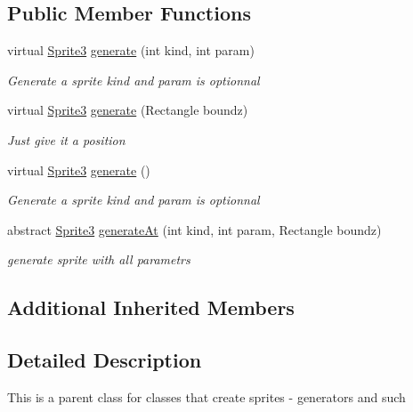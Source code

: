 \subsection*{Public Member Functions}
\begin{DoxyCompactItemize}
\item 
virtual \mbox{\hyperlink{class_r_c___framework_1_1_sprite3}{Sprite3}} \mbox{\hyperlink{class_r_c___framework_1_1_sprite_factory_parent_a08e256b352d7f8042e9ee9d76206660d}{generate}} (int kind, int param)
\begin{DoxyCompactList}\small\item\em Generate a sprite kind and param is optionnal \end{DoxyCompactList}\item 
virtual \mbox{\hyperlink{class_r_c___framework_1_1_sprite3}{Sprite3}} \mbox{\hyperlink{class_r_c___framework_1_1_sprite_factory_parent_a81880f021af6b5ebe905b92a818cec07}{generate}} (Rectangle boundz)
\begin{DoxyCompactList}\small\item\em Just give it a position \end{DoxyCompactList}\item 
virtual \mbox{\hyperlink{class_r_c___framework_1_1_sprite3}{Sprite3}} \mbox{\hyperlink{class_r_c___framework_1_1_sprite_factory_parent_a0149ef937b4d172caf252112939fafa2}{generate}} ()
\begin{DoxyCompactList}\small\item\em Generate a sprite kind and param is optionnal \end{DoxyCompactList}\item 
abstract \mbox{\hyperlink{class_r_c___framework_1_1_sprite3}{Sprite3}} \mbox{\hyperlink{class_r_c___framework_1_1_sprite_factory_parent_ace3d0e7a00dd88a16a652ed5fa6a90bd}{generate\+At}} (int kind, int param, Rectangle boundz)
\begin{DoxyCompactList}\small\item\em generate sprite with all parametrs \end{DoxyCompactList}\end{DoxyCompactItemize}
\subsection*{Additional Inherited Members}


\subsection{Detailed Description}
This is a parent class for classes that create sprites -\/ generators and such 



